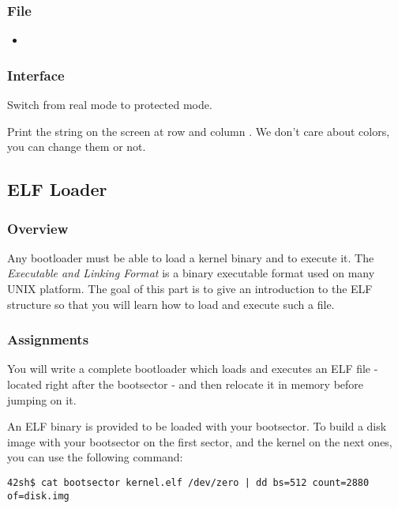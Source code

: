 \subsubsection*{File}
\begin{itemize}
  \item {}
\end{itemize}

\subsubsection*{Interface}
{
  Switch from real mode to protected mode.
}

{
  Print the string  on the screen at row 
  and column . We don't care about colors, you can change them
  or not.
}

%
%

\newpage

\subsection{ELF Loader}

\subsubsection*{Overview}
Any bootloader must be able to load a kernel binary and to execute it.
The \emph{Executable and Linking Format} is a binary executable format used on
many UNIX platform. The goal of this part is to give an introduction to the
ELF structure so that you will learn how to load and execute such a file.

\subsubsection*{Assignments}
You will write a complete bootloader which loads and executes an ELF file
- located right after the bootsector - and then relocate it in memory
before jumping on it.

An ELF binary is provided to be loaded with your bootsector. To build
a disk image with your bootsector on the first sector, and the kernel on the
next ones, you can use the following command:

\begin{verbatim}
42sh$ cat bootsector kernel.elf /dev/zero | dd bs=512 count=2880 of=disk.img
\end{verbatim}

